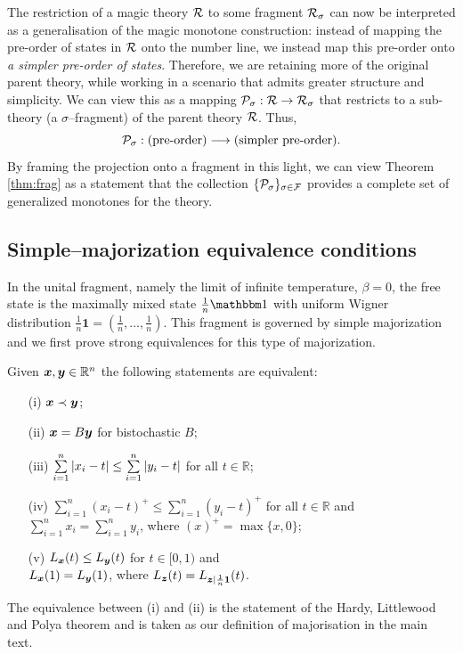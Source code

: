 The restriction of a magic theory $\R$ to some fragment $\R_\sigma$ can now be interpreted as a generalisation of the magic monotone construction: instead of mapping the pre-order of states in $\R$ onto the number line, we instead map this pre-order onto \emph{a simpler pre-order of states}. Therefore, we are retaining more of the original parent theory, while working in a scenario that admits greater structure and simplicity. We can view this as a mapping $\P_\sigma: \R \rightarrow \R_\sigma$ that restricts to a sub-theory (a $\sigma$--fragment) of the parent theory $\R$. Thus,
\begin{equation}
\P_\sigma: \mbox{(pre-order)} \longrightarrow \mbox{(simpler pre-order).}
\end{equation}
By framing the projection onto a fragment in this light, we can view Theorem \ref{thm:frag} as a statement that the collection $\{\P_\sigma\}_{\sigma \in \F}$ provides a complete set of generalized monotones for the theory.
\subsection{Simple--majorization equivalence conditions}

In the unital fragment, namely the limit of infinite temperature, $\beta = 0$, the free state is the maximally mixed state $\frac{1}{n}\id$ with uniform Wigner distribution $\frac{1}{n}\bm{1} = (\frac{1}{n},\dots,\frac{1}{n})$.
This fragment is governed by simple majorization and we first prove strong equivalences for this type of majorization.
\begin{proposition}\label{prop:major}
Given $\bmx, \bmy \in \mathbb{R}^n$ the following statements are equivalent:
 \begin{enumerate}
	\item[(i)]\label{en:m1} $\bmx \prec \bmy$;
	\item[(ii)]\label{en:m2} $\bmx = B \bmy$ for bistochastic $B$;
	\item[(iii)]\label{en:m3} $\sum\limits_{i=1}^n \abs{x_i - t} \leq \sum\limits_{i=1}^n \abs{y_i - t}$ for all $t \in \mathbb{R}$;
	\item[(iv)]\label{en:m4} $\sum\limits_{i=1}^n (x_i - t)^+ \leq \sum\limits_{i=1}^n (y_i - t)^+$ for all $t \in \mathbb{R}$ and \vspace{5pt}\\ $\sum\limits_{i=1}^n x_i = \sum\limits_{i=1}^n y_i$, where $(x)^+ = \max{\{x, 0\}}$;
	\item[(v)]\label{en:m5} $L_{\bmx}(t) \leq L_{\bmy}(t)$ for $t\in [0,1)$	and \vspace{5pt}\\ $L_{\bmx}(1) = L_{\bmy}(1)$, where $L_{\bmz}(t) = L_{\bmz|\frac{1}{n}\bm{1}}(t)$.
 \end{enumerate}
\end{proposition}
	The equivalence between (i) and (ii) is the statement of the Hardy, Littlewood and Polya theorem and is taken as our definition of majorisation in the main text.
	
